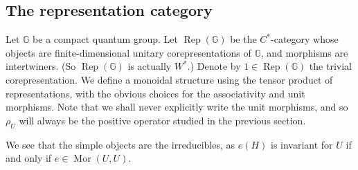 \documentclass[a4paper,11pt]{article}
\theoremstyle{plain}
\theoremstyle{remark}
\newcommand{\G}{\mathbb{G}}
\newcommand{\Rep}{\operatorname{Rep}}
\newcommand{\tr}{\operatorname{Tr}}
\newcommand{\mor}{\operatorname{Mor}}
\begin{document}


\subsection{The representation category}

Let $\G$ be a compact quantum group.  Let $\Rep(\G)$ be the $C^*$-category whose objects are finite-dimensional unitary corepresentations of $\G$, and morphisms are intertwiners.  (So $\Rep(\G)$ is actually $W^*$.)  Denote by $1\in\Rep(\G)$ the trivial corepresentation.  We define a monoidal structure using the tensor product of representations, with the obvious choices for the associativity and unit morphisms.  Note that we shall never explicitly write the unit morphisms, and so $\rho_U$ will always be the positive operator studied in the previous section.

We see that the simple objects are the irreducibles, as $e(H)$ is invariant for $U$ if and only if $e\in\mor(U,U)$.
\end{document}
